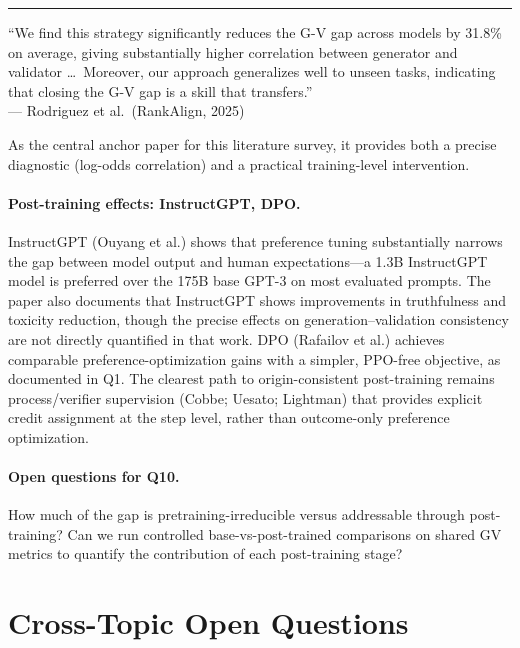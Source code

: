 \documentclass[11pt]{article}
\newenvironment{paperquote}{%
  \vspace{0.5em}%
  \begin{list}{}{%
    \setlength{\leftmargin}{1.5em}%
    \setlength{\rightmargin}{0em}%
    \setlength{\topsep}{0.2em}%
    \setlength{\parsep}{0pt}%
  }%
  \item\relax\small\itshape\leavevmode%
  \hspace{-1.3em}\textcolor{gray!80}{\rule{2pt}{1em}}\hspace{0.5em}%
}{%
  \end{list}%
  \vspace{0.3em}%
}
\begin{document}
\begin{paperquote}
\small ``We find this strategy significantly reduces the G-V gap across models by 31.8\% on average, giving substantially higher correlation between generator and validator \ldots\ Moreover, our approach generalizes well to unseen tasks, indicating that closing the G-V gap is a skill that transfers.''\\
\hfill --- Rodriguez et al.\ (RankAlign, 2025)
\end{paperquote}

As the central anchor paper for this literature survey, it provides both a precise diagnostic (log-odds correlation) and a practical training-level intervention.

\paragraph{Post-training effects: InstructGPT, DPO.}
InstructGPT (Ouyang et al.) shows that preference tuning substantially narrows the gap between model output and human expectations---a 1.3B InstructGPT model is preferred over the 175B base GPT-3 on most evaluated prompts. The paper also documents that InstructGPT shows improvements in truthfulness and toxicity reduction, though the precise effects on generation--validation consistency are not directly quantified in that work. DPO (Rafailov et al.) achieves comparable preference-optimization gains with a simpler, PPO-free objective, as documented in Q1. The clearest path to origin-consistent post-training remains process/verifier supervision (Cobbe; Uesato; Lightman) that provides explicit credit assignment at the step level, rather than outcome-only preference optimization.

\paragraph{Open questions for Q10.}
How much of the gap is pretraining-irreducible versus addressable through post-training? Can we run controlled base-vs-post-trained comparisons on shared GV metrics to quantify the contribution of each post-training stage?

\section{Cross-Topic Open Questions}
\end{document}

